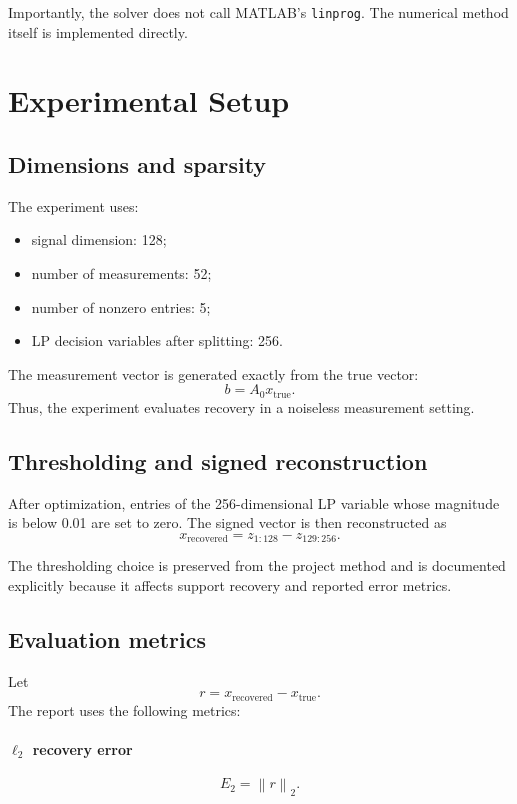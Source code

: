 \documentclass[11pt]{article}
\newcommand{\norm}[1]{\left\lVert #1 \right\rVert}
\begin{document}
Importantly, the solver does not call MATLAB's \texttt{linprog}. The numerical method itself is implemented directly.

\section{Experimental Setup}
\subsection{Dimensions and sparsity}

The experiment uses:
\begin{itemize}[leftmargin=1.5em]
  \item signal dimension: 128;
  \item number of measurements: 52;
  \item number of nonzero entries: 5;
  \item LP decision variables after splitting: 256.
\end{itemize}

The measurement vector is generated exactly from the true vector:
\[
b=A_0x_{\text{true}}.
\]
Thus, the experiment evaluates recovery in a noiseless measurement setting.

\subsection{Thresholding and signed reconstruction}

After optimization, entries of the 256-dimensional LP variable whose magnitude is below 0.01 are set to zero. The signed vector is then reconstructed as
\begin{equation}
\label{eq:recover}
x_{\text{recovered}}
=
z_{1:128}-z_{129:256}.
\end{equation}

The thresholding choice is preserved from the project method and is documented explicitly because it affects support recovery and reported error metrics.

\subsection{Evaluation metrics}

Let
\[
r=x_{\text{recovered}}-x_{\text{true}}.
\]
The report uses the following metrics:

\paragraph{$\ell_2$ recovery error}
\begin{equation}
E_2=\norm{r}_2.
\end{equation}
\end{document}
